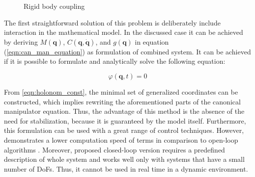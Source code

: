 \begin{figure}[H]
   \centering
   \caption{Rigid body coupling}
   \label{fig:rigid_coupling}
\end{figure}


The first straightforward solution of this problem is deliberately include 
interaction in the mathematical model. In the discussed case it can be achieved 
by deriving $M(\mathbf{q})$, $C(\mathbf{q}, \dot{\mathbf{q}})$, and 
$g(\mathbf{q})$ in equation (\ref{eqn:can_man_equation}) as formulation of 
combined system. It can be achieved if it is possible to formulate and 
analytically solve the following equation:


\begin{equation}
   \label{eqn:holonom_const}
   \varphi (\mathbf{q}, t) = 0
\end{equation}


From \ref{eqn:holonom_const}, the minimal set of generalized coordinates can be 
constructed, which implies rewriting the aforementioned parts of the canonical 
manipulator equation. Thus, the advantage of this method is the absence of the need 
for stabilization, because it is guaranteed by the model itself. Furthermore, this 
formulation can be used with a great range of control techniques. However, 
\cite{BodyDynWithClosedLoop} demonstrates a lower computation speed of terms in 
comparison to open-loop algorithms \cite{Pinocchio}. Moreover, proposed closed-loop
version requires a predefined description of whole system and works well
only with systems that have a small number of DoFs. Thus, it cannot
be used in real time in a dynamic environment.


